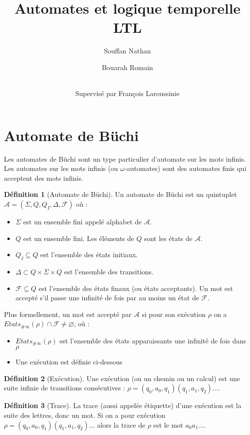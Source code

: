 \documentclass[12pt,a4paper]{article}
\title {Automates et logique temporelle LTL}
\author{
  Souffan Nathan \and
  Bouarah Romain \and
  \\Supervisé par François Laroussinie
}
\theoremstyle{plain}
\theoremstyle{definition}
\newtheorem{defi}{Définition}
\begin{document}
\maketitle
\tableofcontents

\section{Automate de Büchi}
Les automates de Büchi sont un type particulier d'automate sur les mots infinis.
Les automates sur les mots infinis (ou $\omega$-automates) sont des automates finis qui acceptent des mots infinis.

\begin{defi}[Automate de Büchi]
  Un automate de Büchi est un quintuplet $\mathcal{A}=(\Sigma, Q, Q_I, \Delta, \mathcal{F})$ où :
  \begin{itemize}
  \item $\Sigma$ est un ensemble fini appelé alphabet de $\mathcal{A}$.
  \item $Q$ est un ensemble fini. Les éléments de $Q$ sont les états de $\mathcal{A}$.
  \item $Q_I \subseteq Q$ est l'ensemble des états initiaux.
  \item $\Delta \subset Q \times \Sigma \times Q$ est l'ensemble des transitions.
  \item $\mathcal{F} \subseteq Q$ est l'ensemble des états finaux (ou états acceptants).
    Un mot est accepté s'il passe une infinité de fois par au moins un état de $\mathcal{F}$.
  \end{itemize}

  Plus formellement, un mot est accepté par $\mathcal{A}$ si pour son exécution $\rho$ on a $Etats_{\#\infty}(\rho) \cap \mathcal{F} \neq \varnothing$, où :
  \begin{itemize}
  \item $Etats_{\#\infty}(\rho)$ est l'ensemble des états apparaissants une infinité de fois dans $\rho$
  \item Une exécution est définie ci-dessous
  \end{itemize}
\end{defi}

\begin{defi}[Exécution]
  Une exécution (ou un chemin ou un calcul) est une suite infinie de transitions consécutives : $\rho = (q_0,a_0,q_1)(q_1,a_1,q_2)\dots$.
\end{defi}

\begin{defi}[Trace]
  La trace (aussi appelée étiquette) d'une exécution est la suite des lettres, donc un mot.
  Si on a pour exécution $\rho = (q_0,a_0,q_1)(q_1,a_1,q_2)\dots$ alors la trace de $\rho$ est le mot $a_0a_1\dots$.
\end{defi}
\end{document}
